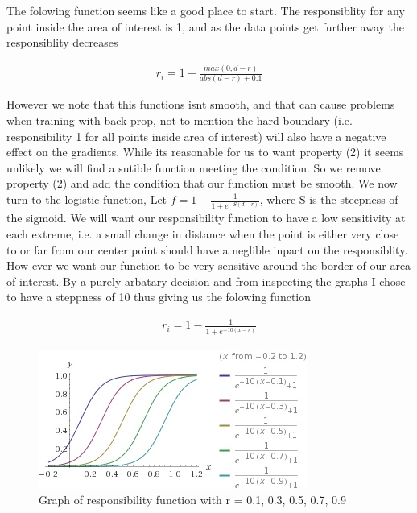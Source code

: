\documentclass{article}
\begin{document}
The folowing function seems like a good place to start. The responsiblity for any point inside the area of interest is 1, and as the data points get further away the responsiblity decreases

\begin{align}
r_i = 1 - \frac{max(0, d-r)}{abs(d-r) + 0.1}
\end{align}

However we note that this functions isnt smooth, and that can cause problems when training with back prop, not to mention the hard boundary (i.e. responsibility 1 for all points inside area of interest) will also have a negative effect on the gradients. While its reasonable for us to want property (2) it seems unlikely we will find a sutible function meeting the condition. So we remove property (2) and add the condition that our function must be smooth. We now turn to the logistic function, Let $f = 1 - \frac{1}{1 + e^{-S(d - r)}}$, where S is the steepness of the sigmoid. We will want our responsibility function to have a low sensitivity at each extreme, i.e. a small change in distance when the point is either very close to or far from our center point should have a neglible inpact on the responsiblity. How ever we want our function to be very sensitive around the border of our area of interest. By a purely arbatary decision and from inspecting the graphs I chose to have a steppness of 10 thus giving us the folowing function

\begin{align}
r_i = 1 - \frac{1}{1 + e^{-10(x-r)}}
\end{align}

\begin{figure}[H]
\centering
  \begin{minipage}[b]{0.4\textwidth}
    \includegraphics[width=\textwidth]{Responsibility-Function.jpg}
    \caption{Graph of responsibility function with r = 0.1, 0.3, 0.5, 0.7, 0.9}
  \end{minipage}
  \hfill
\end{figure}
\end{document}
